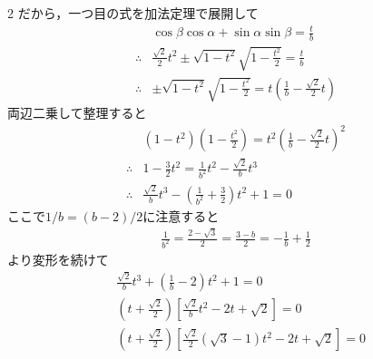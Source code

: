 \documentclass[../../main.tex]{subfiles}
\begin{document}
\begin{multicols}{2}
  だから，一つ目の式を加法定理で展開して
  \begin{align}
               & \cos\beta\cos\alpha + \sin\alpha\sin\beta = \frac{t}{b}             \nonumber                              \\
    \therefore & \frac{\sqrt{2}}{2} t^2 \pm \sqrt{1-t^2} \sqrt{1-\frac{t^2}{2}} = \frac{t}{b} \nonumber                     \\
    \therefore & \pm \sqrt{1-t^2}\sqrt{1-\frac{t^2}{2}} = t\left(\frac{1}{b}-\frac{\sqrt{2}}{2}t\right) \label{2001-2:eq:4}
  \end{align}
  両辺二乗して整理すると
  \begin{align}
               & \left(1-t^2\right)\left(1-\frac{t^2}{2}\right) = t^2\left(\frac{1}{b}-\frac{\sqrt{2}}{2}t\right)^2 \\
    \therefore & 1-\frac{3}{2}t^2 = \frac{1}{b^2}t^2-\frac{\sqrt{2}}{b}t^3                                          \\
    \therefore & \frac{\sqrt{2}}{b}t^3  - \left(\frac{1}{b^2}+\frac{3}{2}\right)t^2 +1 = 0
  \end{align}
  ここで$1/b=(b-2)/2$に注意すると
  \begin{align*}
    \frac{1}{b^2} = \frac{2-\sqrt{3}}{2} = \frac{3-b}{2} = -\frac{1}{b} + \frac{1}{2}
  \end{align*}
  より変形を続けて
  \begin{align}
     & \frac{\sqrt{2}}{b}t^3 + \left(\frac{1}{b}-2\right)t^2 +1 = 0       \nonumber                                        \\
     & \left(t+\frac{\sqrt{2}}{2}\right)\left[\frac{\sqrt{2}}{b}t^2-2t+\sqrt{2}\right] = 0 \nonumber                       \\
     & \left(t+\frac{\sqrt{2}}{2}\right)\left[\frac{\sqrt{2}}{2}(\sqrt{3}-1)t^2-2t+\sqrt{2}\right] = 0 \label{2001-2:eq:3}
  \end{align}


\end{multicols}
\end{document}
